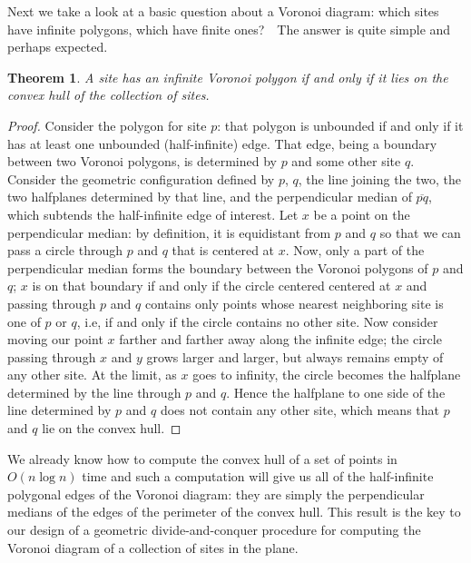\documentclass[11pt]{article}
\newtheorem{theorem}{Theorem}
\begin{document}
Next we take a look at a basic question about a Voronoi diagram: which
sites have infinite polygons, which have finite ones?\ \ The answer is
quite simple and perhaps expected.
\begin{theorem}
  A site has an infinite Voronoi polygon if and only if it lies on
  the convex hull of the collection of sites.
\end{theorem}
\begin{proof}
  Consider the polygon for site $p$: that polygon is unbounded if and only if
  it has at least one unbounded (half-infinite) edge.   That edge, being a
  boundary between two Voronoi polygons, is determined by $p$ and some other
  site $q$.  Consider the geometric configuration defined by $p$, $q$, the line
  joining the two, the two halfplanes determined by that line, and the
  perpendicular median of $\overline{pq}$, which subtends the half-infinite
  edge of interest.  Let $x$ be a point on the perpendicular median: by
  definition, it is equidistant from $p$ and $q$ so that we can pass a circle
  through $p$ and $q$ that is centered at $x$.  Now, only a part of the
  perpendicular median forms the boundary between the Voronoi polygons of $p$
  and $q$; $x$ is on that boundary if and only if the circle centered centered
  at $x$ and passing through $p$ and $q$ contains only points whose nearest
  neighboring site is one of $p$ or $q$, i.e, if and only if the circle
  contains no other site.  Now consider moving our point $x$ farther and
  farther away along the infinite edge; the circle passing through $x$ and $y$
  grows larger and larger, but always remains empty of any other site.  At the
  limit, as $x$ goes to infinity, the circle becomes the halfplane determined
  by the line through $p$ and $q$.  Hence the halfplane to one side of the line
  determined by $p$ and $q$ does not contain any other site, which means that
  $p$ and $q$ lie on the convex hull.   
\end{proof}
We already know how to compute the convex hull of a set of points in
$O(n\log n)$ time and such a computation will give us all of the half-infinite
polygonal edges of the Voronoi diagram: they are simply the perpendicular
medians of the edges of the perimeter of the convex hull.   This result
is the key to our design of a geometric divide-and-conquer procedure for
computing the Voronoi diagram of a collection of sites in the plane.
\end{document}
